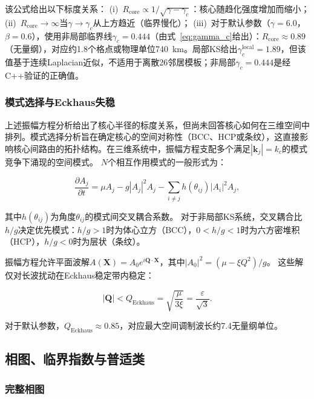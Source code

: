 \documentclass[sn-nature,pdflatex]{sn-jnl}
\begin{document}
该公式给出以下标度关系：
(i)~$R_{\text{core}} \propto 1/\sqrt{\gamma - \gamma_c}$：核心随趋化强度增加而缩小；
(ii)~$R_{\text{core}} \to \infty$当$\gamma \to \gamma_c$从上方趋近（临界慢化）；
(iii)~对于默认参数（$\gamma = 6.0$，$\beta = 0.6$），使用非局部临界线$\gamma_c = 0.444$（由式~\ref{eq:gamma_c}给出）：$R_{\text{core}} \approx 0.89$（无量纲），对应约1.8个格点或物理单位\SI{740}{\km}。局部KS给出$\gamma_c^{\text{local}} = 1.89$，但该值基于连续Laplacian近似，不适用于离散26邻居模板；非局部$\gamma_c = 0.444$是经C++验证的正确值。

\subsubsection{模式选择与Eckhaus失稳}

上述振幅方程分析给出了核心半径的标度关系，但尚未回答核心如何在三维空间中排列。模式选择分析旨在确定核心的空间对称性（BCC、HCP或条纹），这直接影响核心间路由的拓扑结构。在三维系统中，振幅方程支配多个满足$|\mathbf{k}_j| = k_c$的模式竞争下涌现的空间模式。
$N$个相互作用模式的一般形式为：

\begin{equation}
\frac{\partial A_j}{\partial t} = \mu A_j - g |A_j|^2 A_j - \sum_{i \neq j} h(\theta_{ij}) |A_i|^2 A_j,
\end{equation}

其中$h(\theta_{ij})$为角度$\theta_{ij}$的模式间交叉耦合系数。
对于非局部KS系统，交叉耦合比$h/g$决定优先模式：$h/g > 1$时为体心立方（BCC），$0 < h/g < 1$时为六方密堆积（HCP），$h/g < 0$时为层状（条纹）。

振幅方程允许平面波解$A(\mathbf{X}) = A_0 e^{i\mathbf{Q}\cdot\mathbf{X}}$，其中$|A_0|^2 = (\mu - \xi Q^2)/g$。
这些解仅对长波扰动在Eckhaus稳定带内稳定：

\begin{equation}
|\mathbf{Q}| < Q_{\text{Eckhaus}} = \sqrt{\frac{\mu}{3\xi}} = \frac{\varepsilon}{\sqrt{3}}.
\end{equation}

对于默认参数，$Q_{\text{Eckhaus}} \approx 0.85$，对应最大空间调制波长约\num{7.4}无量纲单位。

\subsection{相图、临界指数与普适类}
\label{sec:phase_diagram}

\subsubsection{完整相图}
\end{document}
